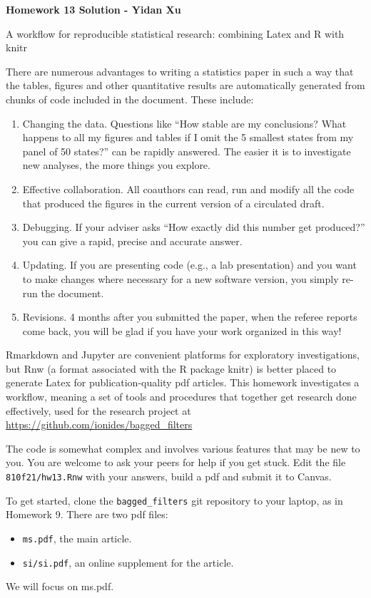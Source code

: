 \documentclass[12pt]{article}\usepackage[]{graphicx}\usepackage[]{color}
\begin{document}
\begin{center}\bf
Homework 13 Solution - Yidan Xu

A workflow for reproducible statistical research: combining Latex and R with knitr

\end{center}

There are numerous advantages to writing a statistics paper in such a way that the tables, figures and other quantitative results are automatically generated from chunks of code included in the document. These include:
\begin{enumerate}
\item Changing the data. Questions like ``How stable are my conclusions? What happens to all my figures and tables if I omit the 5 smallest states from my panel of 50 states?'' can be rapidly answered. The easier it is to investigate new analyses, the more things you explore. 
\item Effective collaboration. All coauthors can read, run and modify all the code that produced the figures in the current version of a circulated draft.
\item Debugging. If your adviser asks ``How exactly did this number get produced?'' you can give a rapid, precise and accurate answer.
\item Updating. If you are presenting code (e.g., a lab presentation) and you want to make changes where necessary for a new software version, you simply re-run the document.
\item Revisions. 4 months after you submitted the paper, when the referee reports come back, you will be glad if you have your work organized in this way!
\end{enumerate}
Rmarkdown and Jupyter are convenient platforms for exploratory investigations, but Rnw (a format associated with the R package knitr) is better placed to generate Latex for publication-quality pdf articles. This homework investigates a workflow, meaning a set of tools and procedures that together get research done effectively, used for the research project at \url{https://github.com/ionides/bagged_filters}

The code is somewhat complex and involves various features that may be new to you. You are welcome to ask your peers for help if you get stuck. Edit the file \texttt{810f21/hw13.Rnw} with your answers, build a pdf and submit it to Canvas.

To get started, clone the \texttt{bagged\_filters} git repository to your laptop, as in Homework 9. There are two pdf files:
  \begin{itemize}
  \item \texttt{ms.pdf}, the main article.
  \item \texttt{si/si.pdf}, an online supplement for the article.
  \end{itemize}
  We will focus on ms.pdf.
\end{document}
